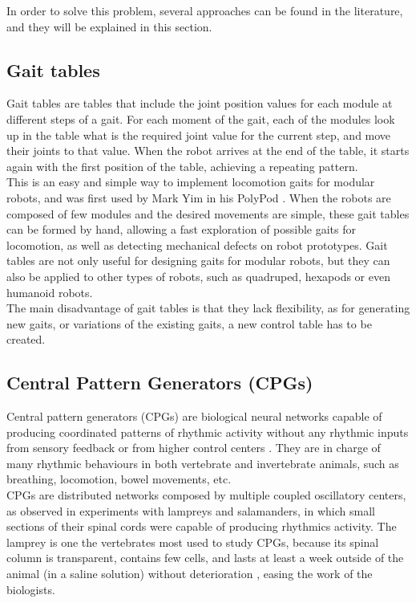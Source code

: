 In order to solve this problem, several approaches can be found in the literature, and they will be explained in this section.\\

\subsection{Gait tables}
\label{gait_gaittables}

Gait tables are tables that include the joint position values for each module at different steps of a gait. For each moment of the gait, each of the modules look up in the table what is the required joint value for the current step, and move their joints to that value. When the robot arrives at the end of the table, it starts again with the first position of the table, achieving a repeating pattern.\\

This is an easy and simple way to implement locomotion gaits for modular robots, and was first used by Mark Yim in his PolyPod \cite{Yim1993}. When the robots are composed of few modules and the desired movements are simple, these gait tables can be formed by hand, allowing a fast exploration of possible gaits for locomotion, as well as detecting mechanical defects on robot prototypes. Gait tables are not only useful for designing gaits for modular robots, but they can also be applied to other types of robots, such as quadruped, hexapods or even humanoid robots.\\

The main disadvantage of gait tables is that they lack flexibility, as for generating new gaits, or variations of the existing gaits, a new control table has to be created.\\

\subsection{Central Pattern Generators (CPGs)}
\label{gait_cpgs}
Central pattern generators (CPGs) are biological neural networks capable of producing coordinated patterns of rhythmic activity without any rhythmic inputs from sensory feedback or from higher control centers \cite{Ijspeert2008}. They are in charge of many rhythmic behaviours in both vertebrate and invertebrate animals, such as breathing, locomotion, bowel movements, etc.\\

CPGs are distributed networks composed by multiple coupled oscillatory centers, as observed in experiments with lampreys and salamanders, in which small sections of their spinal cords were capable of producing rhythmics activity. The lamprey is one the vertebrates most used to study CPGs, because its spinal column is transparent, contains few cells, and lasts at least a week outside
of the animal (in a saline solution) without deterioration \cite{Rovainen1979}, easing the work of the biologists.\\

